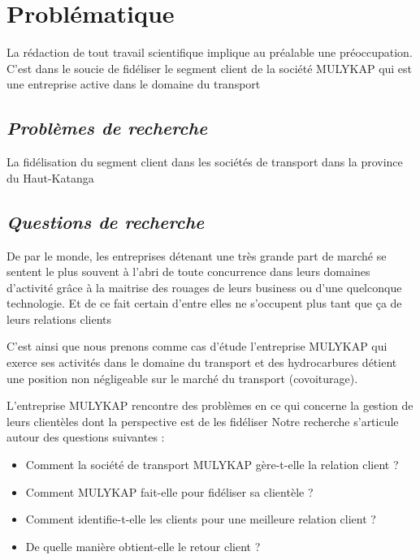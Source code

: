 \documentclass[a4paper,12pt,oneside]{book}
\begin{document}
    \section[Problématique]{Problématique}
    La rédaction de tout travail scientifique implique au préalable une préoccupation.
    C’est dans le soucie de fidéliser le segment client de la société MULYKAP qui est une
    entreprise active dans le domaine du transport
        \subsection[Problèmes de recherche]{\textit{Problèmes de recherche}}
        La fidélisation du segment client dans les sociétés de transport
        dans la province du Haut-Katanga

        \subsection[Questions de recherche]{\textit{Questions de recherche}}
        De par le monde, les entreprises détenant une très grande part de marché
        se sentent le plus souvent à l’abri de toute concurrence dans leurs domaines d’activité
        grâce à la maitrise des rouages de leurs business ou
        d’une quelconque technologie. \cite*{Rouviere2010} Et de ce fait certain
        d’entre elles ne s’occupent plus tant que ça de leurs relations clients
        \newline

        C’est ainsi que nous prenons comme cas d’étude l’entreprise MULYKAP qui exerce 
        ses activités dans le domaine du transport et des hydrocarbures détient
        une position non négligeable sur le marché du transport (covoiturage).
        \newline

        L’entreprise MULYKAP rencontre des problèmes en ce qui concerne
        la gestion de leurs clientèles dont la perspective est de les
        fidéliser
        Notre recherche s’articule autour des questions suivantes :
        \newline 
            \begin{itemize}
                \item Comment la société de transport MULYKAP gère-t-elle
                la relation client ?
                \newline
                \item Comment MULYKAP fait-elle pour fidéliser sa clientèle ?
                \newline
                \item Comment identifie-t-elle les clients pour une
                meilleure relation client ?
                \newline
                \item De quelle manière obtient-elle le retour client ?
            \end{itemize}
\end{document}
